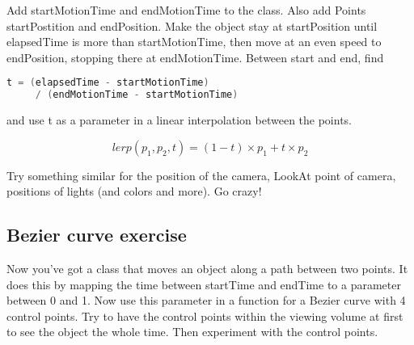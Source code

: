 \documentclass[12pt]{article}
\begin{document}
Add startMotionTime and endMotionTime to the class. Also add Points
startPostition and endPosition. Make the object stay at startPosition until
elapsedTime is more than startMotionTime, then move at an even speed to
endPosition, stopping there at endMotionTime. Between start and end, find

\begin{lstlisting}[frame=single, language=Java, basicstyle=\footnotesize\ttfamily]
t = (elapsedTime - startMotionTime) 
     / (endMotionTime - startMotionTime)
\end{lstlisting}
and use t as a parameter in a linear interpolation between the points.

\begin{equation}
lerp(p_1, p_2, t) = (1-t) \times p_1 + t \times p_2
\end{equation}

Try something similar for the position of the camera, LookAt point of camera,
positions of lights (and colors and more). Go crazy!

\subsection{Bezier curve exercise}
Now you've got a class that moves an object along a path between two points. It
does this by mapping the time between startTime and endTime to a parameter
between 0 and 1. Now use this parameter in a function for a Bezier curve with 4
control points. Try to have the control points within the viewing volume at first to
see the object the whole time. Then experiment with the control points.
\end{document}

